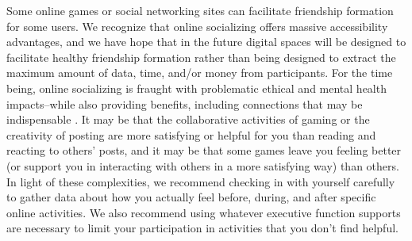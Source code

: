 \documentclass[12pt,letterpaper]{book}
\begin{document}
Some online games or social networking sites can facilitate friendship formation for some users. We recognize that online socializing offers massive accessibility advantages, and we have hope that in the future digital spaces will be designed to facilitate healthy friendship formation \cite{gowen2012young} rather than being designed to extract the maximum amount of data, time, and/or money from participants. For the time being, online socializing is fraught with problematic ethical and mental health impacts–while also providing benefits, including connections that may be indispensable \cite{pantic2014online,kim2022tech,cohen2017relationship,prochnow2021depressive}. It may be that the collaborative activities of gaming or the creativity of posting are more satisfying or helpful for you than reading and reacting to others' posts, and it may be that some games leave you feeling better (or support you in interacting with others in a more satisfying way) than others. In light of these complexities, we recommend checking in with yourself carefully to gather data about how you actually feel before, during, and after specific online activities. We also recommend using whatever executive function supports  are necessary to limit your participation in activities that you don't find helpful.
\end{document}
